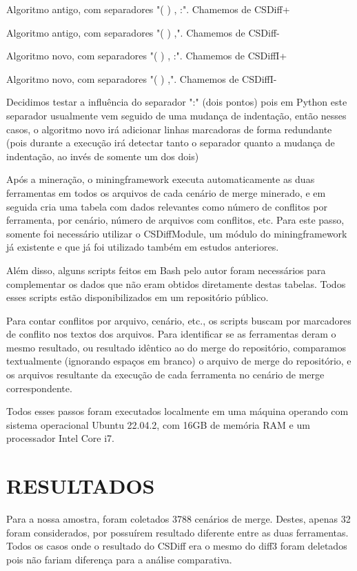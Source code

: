 \begin{compactenum}[(1)]
	\item Algoritmo antigo, com separadores "( ) , :". Chamemos de CSDiff+
	\item Algoritmo antigo, com separadores "( ) ,". Chamemos de CSDiff-
	\item Algoritmo novo, com separadores "( ) , :". Chamemos de CSDiffI+
	\item Algoritmo novo, com separadores "( ) ,". Chamemos de CSDiffI-
\end{compactenum}

Decidimos testar a influência do separador ":" (dois pontos) pois em Python este separador usualmente vem seguido de uma
mudança de indentação, então nesses casos, o algoritmo novo irá adicionar linhas marcadoras de forma redundante (pois
durante a execução irá detectar tanto o separador quanto a mudança de indentação, ao invés de somente um dos dois)

Após a mineração, o miningframework executa automaticamente as duas ferramentas em todos os arquivos de cada cenário de merge
minerado, e em seguida cria uma tabela com dados relevantes como número de conflitos por
ferramenta, por cenário, número de arquivos com conflitos, etc. Para este passo, somente foi necessário utilizar
o CSDiffModule, um módulo do miningframework já existente e que já foi utilizado também em estudos anteriores.

Além disso, alguns scripts feitos em Bash pelo autor foram necessários para complementar os dados que não eram obtidos
diretamente destas tabelas. Todos esses scripts estão disponibilizados em um repositório público. %

Para contar conflitos por arquivo,
cenário, etc., os scripts buscam por marcadores
de conflito nos textos dos arquivos. Para identificar se as ferramentas deram o mesmo resultado,
ou resultado idêntico ao do merge
do repositório, comparamos textualmente (ignorando espaços em
branco) o arquivo de merge do repositório, e os arquivos resultante da execução de cada
ferramenta no cenário de merge correspondente.

Todos esses passos foram executados localmente em uma máquina operando com sistema operacional Ubuntu 22.04.2,
com 16GB de memória
RAM e um processador Intel Core i7.

\section{RESULTADOS}
Para a nossa amostra, foram coletados 3788 cenários de merge. Destes, apenas 32 foram considerados, por possuírem resultado
diferente entre as duas ferramentas. Todos os casos onde o resultado do CSDiff era o mesmo do diff3
foram deletados pois não fariam
diferença para a análise comparativa.

